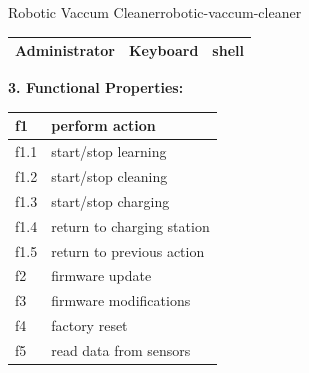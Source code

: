 \documentclass[12pt]{article}
\begin{document}
\begin{example}{Robotic Vaccum Cleaner}{robotic-vaccum-cleaner}
\begin{table}[H]
\begin{tabular}{|c|c|c|}
      \hline
      Administrator & Keyboard & shell \\
      \hline
    \end{tabular}
  \end{table}
  \textbf{3. Functional Properties:}
  \begin{table}[H]
    \centering
    \begin{tabular}{|l|l|}
      \hline
      f1 & perform action \\
      \hline
      f1.1 & start/stop learning \\
      \hline
      f1.2 & start/stop cleaning \\
      \hline
      f1.3 & start/stop charging \\
      \hline
      f1.4 & return to charging station \\
      \hline
      f1.5 & return to previous action \\
      \hline

      f2 & firmware update \\
      \hline
      f3 & firmware modifications \\
      \hline
      f4 & factory reset \\
      \hline

      f5 & read data from sensors \\
      \hline
    \end{tabular}
  \end{table}


  
\end{example}








\newpage
\end{document}
